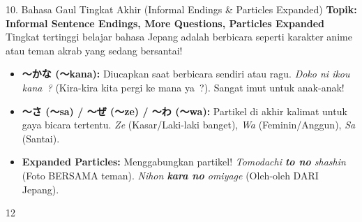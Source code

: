 \begin{lessonbox}{10. Bahasa Gaul Tingkat Akhir (Informal Endings \& Particles Expanded)}
    \textbf{Topik: Informal Sentence Endings, More Questions, Particles Expanded} \\
    Tingkat tertinggi belajar bahasa Jepang adalah berbicara seperti karakter anime atau teman akrab yang sedang bersantai!
    \begin{itemize}
        \item \textbf{〜かな (〜kana):} Diucapkan saat berbicara sendiri atau ragu. \textit{Doko ni ikou kana~?} (Kira-kira kita pergi ke mana ya~?). Sangat imut untuk anak-anak!
        \item \textbf{〜さ (〜sa) / 〜ぜ (〜ze) / 〜わ (〜wa):} Partikel di akhir kalimat untuk gaya bicara tertentu. \textit{Ze} (Kasar/Laki-laki banget), \textit{Wa} (Feminin/Anggun), \textit{Sa} (Santai).
        \item \textbf{Expanded Particles:} Menggabungkan partikel! \textit{Tomodachi \textbf{to no} shashin} (Foto BERSAMA teman). \textit{Nihon \textbf{kara no} omiyage} (Oleh-oleh DARI Jepang).
    \end{itemize}
\end{lessonbox}

\begin{convobox}{12}
    \noindent
      
      
     

    \vspace{1.5em}
\end{convobox}

